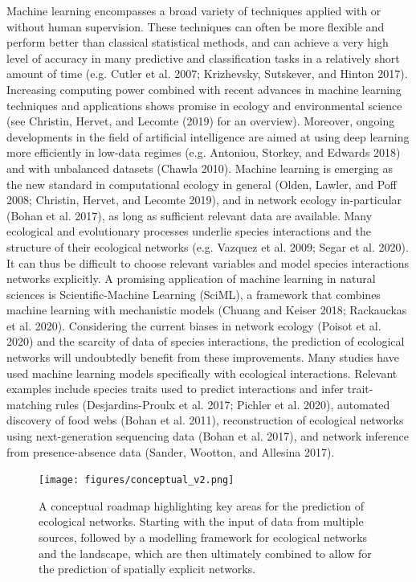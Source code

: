 \documentclass[10pt,oneside]{article}
\begin{document}
Machine learning encompasses a broad variety of techniques applied with
or without human supervision. These techniques can often be more
flexible and perform better than classical statistical methods, and can
achieve a very high level of accuracy in many predictive and
classification tasks in a relatively short amount of time (e.g. Cutler
et al. 2007; Krizhevsky, Sutskever, and Hinton 2017). Increasing
computing power combined with recent advances in machine learning
techniques and applications shows promise in ecology and environmental
science (see Christin, Hervet, and Lecomte (2019) for an overview).
Moreover, ongoing developments in the field of artificial intelligence
are aimed at using deep learning more efficiently in low-data regimes
(e.g. Antoniou, Storkey, and Edwards 2018) and with unbalanced datasets
(Chawla 2010). Machine learning is emerging as the new standard in
computational ecology in general (Olden, Lawler, and Poff 2008;
Christin, Hervet, and Lecomte 2019), and in network ecology
in-particular (Bohan et al. 2017), as long as sufficient relevant data
are available. Many ecological and evolutionary processes underlie
species interactions and the structure of their ecological networks
(e.g. Vazquez et al. 2009; Segar et al. 2020). It can thus be difficult
to choose relevant variables and model species interactions networks
explicitly. A promising application of machine learning in natural
sciences is Scientific-Machine Learning (SciML), a framework that
combines machine learning with mechanistic models (Chuang and Keiser
2018; Rackauckas et al. 2020). Considering the current biases in network
ecology (Poisot et al. 2020) and the scarcity of data of species
interactions, the prediction of ecological networks will undoubtedly
benefit from these improvements. Many studies have used machine learning
models specifically with ecological interactions. Relevant examples
include species traits used to predict interactions and infer
trait-matching rules (Desjardins-Proulx et al. 2017; Pichler et al.
2020), automated discovery of food webs (Bohan et al. 2011),
reconstruction of ecological networks using next-generation sequencing
data (Bohan et al. 2017), and network inference from presence-absence
data (Sander, Wootton, and Allesina 2017).

\begin{figure}
\hypertarget{fig:conceptual}{%
\centering
\texttt{[image: figures/conceptual\_v2.png]}
\caption{A conceptual roadmap highlighting key areas for the prediction
of ecological networks. Starting with the input of data from multiple
sources, followed by a modelling framework for ecological networks and
the landscape, which are then ultimately combined to allow for the
prediction of spatially explicit networks.}\label{fig:conceptual}
}
\end{figure}
\end{document}
